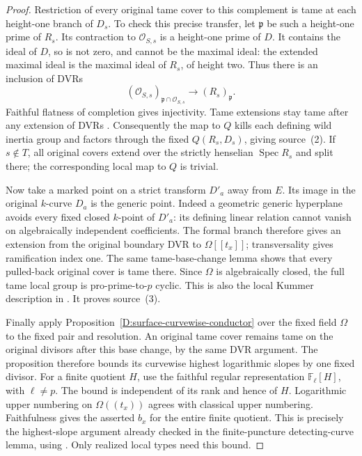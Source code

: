 \begin{proof}
Restriction of every original tame cover to this complement is
tame at each height-one branch of $D_s$. To check this precise
transfer, let $\mathfrak p$ be such a height-one prime of $R_s$.
Its contraction to $\mathcal O_{S,s}$ is a height-one prime of
$D$. It contains the ideal of $D$, so is not zero, and cannot
be the maximal ideal: the extended maximal ideal is the maximal
ideal of $R_s$, of height two. Thus there is an inclusion of DVRs
\[
 (\mathcal O_{S,s})_{\mathfrak p\cap\mathcal O_{S,s}}
                               \longrightarrow (R_s)_{\mathfrak p}.
                                                        \tag{D.GTP.3}
\]
Faithful flatness of completion gives injectivity. Tame
extensions stay tame after any extension of DVRs
\citep[Lemma~15.116.9(2), Tag~0EXY]{StacksDFiniteTameDescent}.
Consequently the map to $Q$ kills each defining wild inertia
group and factors through the fixed $Q(R_s,D_s)$, giving
source~(2). If $s\notin T$, all original covers extend over
the strictly henselian $\operatorname{Spec}R_s$ and split
there; the corresponding local map to $Q$ is trivial.

Now take a marked point on a strict transform $D'_a$ away from
$E$. Its image in the original $k$-curve $D_a$ is the generic
point. Indeed a geometric generic hyperplane avoids every
fixed closed $k$-point of $D'_a$: its defining linear relation
cannot vanish on algebraically independent coefficients.
The formal branch therefore gives an extension from the
original boundary DVR to $\Omega[[t_x]]$; transversality gives
ramification index one. The same tame-base-change lemma shows
that every pulled-back original cover is tame there.
Since $\Omega$ is algebraically closed, the full tame local
group is pro-prime-to-$p$ cyclic. This is also the local
Kummer description in \citep[Expose~XIII, Propositions~5.1--5.2
and Corollary~5.3]{C_SGA1}. It proves source~(3).

Finally apply Proposition~\ref{D:surface-curvewise-conductor}
over the fixed field $\Omega$ to the fixed pair and resolution.
An original tame cover remains tame on the original divisors
after this base change, by the same DVR argument. The proposition
therefore bounds its curvewise highest logarithmic slopes by
one fixed divisor. For a finite quotient $H$, use the faithful
regular representation $\mathbb F_\ell[H]$, with $\ell\ne p$.
The bound is independent of its rank and hence of $H$.
Logarithmic upper numbering on $\Omega((t_x))$ agrees with
classical upper numbering. Faithfulness gives the asserted
$b_x$ for the entire finite quotient. This is precisely the
highest-slope argument already checked in the finite-puncture
detecting-curve lemma, using
\citep[Theorem~3.5, Remark~3.9 and Proposition~5.8(3)]
{C_HuTeyssierRam2025}. Only realized local types need this bound.
\end{proof}

